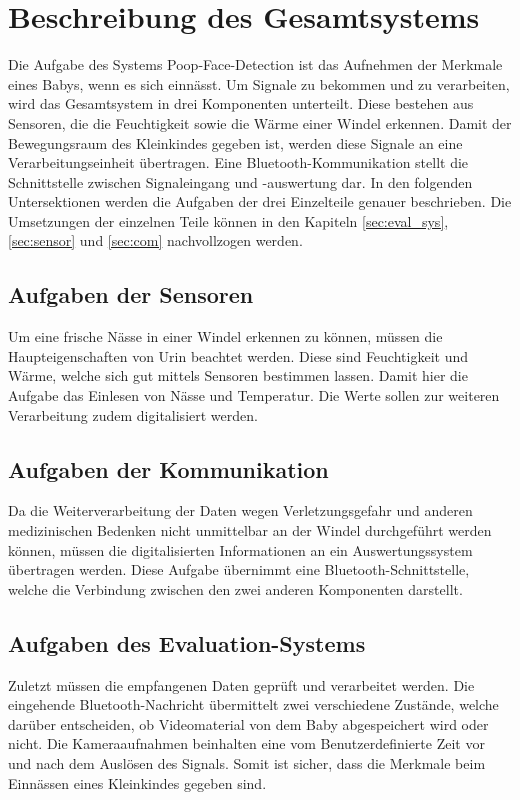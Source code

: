 \section{Beschreibung des Gesamtsystems}
\label{sec:Gesamtsystem}

Die Aufgabe des Systems Poop-Face-Detection ist das Aufnehmen der Merkmale eines Babys, wenn es sich einnässt. Um Signale zu bekommen und zu verarbeiten, wird das Gesamtsystem in drei Komponenten unterteilt. Diese bestehen aus Sensoren, die die Feuchtigkeit sowie die Wärme einer Windel erkennen. Damit der Bewegungsraum des Kleinkindes gegeben ist, werden diese Signale an eine Verarbeitungseinheit übertragen. Eine Bluetooth-Kommunikation stellt die Schnittstelle zwischen Signaleingang und -auswertung dar. In den folgenden Untersektionen werden die Aufgaben der drei Einzelteile genauer beschrieben. Die Umsetzungen der einzelnen Teile können in den Kapiteln \ref{sec:eval_sys}, \ref{sec:sensor} und \ref{sec:com} nachvollzogen werden.

\subsection{Aufgaben der Sensoren}

Um eine frische Nässe in einer Windel erkennen zu können, müssen die Haupteigenschaften von Urin beachtet werden. Diese sind Feuchtigkeit und Wärme, welche sich gut mittels Sensoren bestimmen lassen. Damit hier die Aufgabe das Einlesen von Nässe und Temperatur. Die Werte sollen zur weiteren Verarbeitung zudem digitalisiert werden.

\subsection{Aufgaben der Kommunikation}

Da die Weiterverarbeitung der Daten wegen Verletzungsgefahr und anderen medizinischen Bedenken nicht unmittelbar an der Windel durchgeführt werden können, müssen die digitalisierten Informationen an ein Auswertungssystem übertragen werden. Diese Aufgabe übernimmt eine Bluetooth-Schnittstelle, welche die Verbindung zwischen den zwei anderen Komponenten darstellt.

\subsection{Aufgaben des Evaluation-Systems}

Zuletzt müssen die empfangenen Daten geprüft und verarbeitet werden. Die eingehende Bluetooth-Nachricht übermittelt zwei verschiedene Zustände, welche darüber entscheiden, ob Videomaterial von dem Baby abgespeichert wird oder nicht. Die Kameraaufnahmen beinhalten eine vom Benutzerdefinierte Zeit vor und nach dem Auslösen des Signals. Somit ist sicher, dass die Merkmale beim Einnässen eines Kleinkindes gegeben sind.




